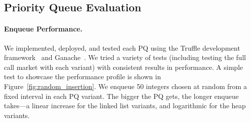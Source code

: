 
\subsection{Priority Queue Evaluation}

\paragraph{Enqueue Performance.} We implemented, deployed, and tested each PQ using the Truffle development framework~\cite{TruffleO71:online} and Ganache~\cite{GanacheT25:online}. We tried a variety of tests (including testing the full call market with each variant) with consistent results in performance. A simple test to showcase the performance profile is shown in Figure~\ref{fig:random_insertion}. We enqueue 50 integers chosen at random from a fixed interval in each PQ variant. The bigger the PQ gets, the longer enqueue takes---a linear increase for the linked list variants, and logarithmic for the heap variants.





%



